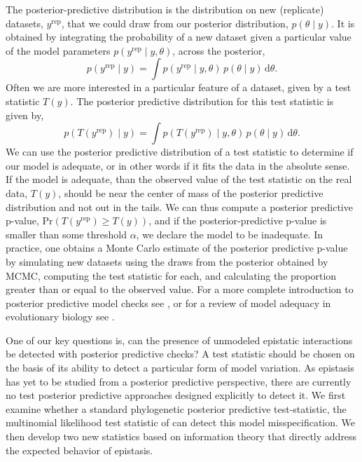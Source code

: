 \documentclass[11pt]{article}
\begin{document}
The posterior-predictive distribution is the distribution on new (replicate) datasets, $y^{\text{rep}}$, that we could draw from our posterior distribution, $p(\theta \mid y)$.
It is obtained by integrating the probability of a new dataset given a particular value of the model parameters $p(y^{\text{rep}} \mid y, \theta)$, across the posterior,
\[
  p(y^{\text{rep}} \mid y) =
  \int p(y^{\text{rep}} \mid y, \theta)\,
  p(\theta \mid y)\,
  \text{d}\theta.
\]
Often we are more interested in a particular feature of a dataset, given by a test statistic $T(y)$.
The posterior predictive distribution for this test statistic is given by,
\[
  p(T(y^{\text{rep}}) \mid y) =
  \int p(T(y^{\text{rep}}) \mid y, \theta)\,
  p(\theta \mid y)\,
  \text{d}\theta.
\]
We can use the posterior predictive distribution of a test statistic to determine if our model is adequate, or in other words if it fits the data in the absolute sense.
If the model is adequate, than the observed value of the test statistic on the real data, $T(y)$, should be near the center of mass of the posterior predictive distribution and not out in the tails.
We can thus compute a posterior predictive p-value, $\text{Pr}(T(y^{\text{rep}}) \geq T(y))$, and if the posterior-predictive p-value is smaller than some threshold $\alpha$, we declare the model to be inadequate.
In practice, one obtains a Monte Carlo estimate of the posterior predictive p-value by simulating new datasets using the draws from the posterior obtained by MCMC, computing the test statistic for each, and calculating the proportion greater than or equal to the observed value.
For a more complete introduction to posterior predictive model checks see \citet{gelman2004bda}, or for a review of model adequacy in evolutionary biology see \citet{brown2018evaluating}.

One of our key questions is, can the presence of unmodeled epistatic interactions be detected with posterior predictive checks?
A test statistic should be chosen on the basis of its ability to detect a particular form of model variation.
As epistasis has yet to be studied from a posterior predictive perspective, there are currently no test posterior predictive approaches designed explicitly to detect it.
We first examine whether a standard phylogenetic posterior predictive test-statistic, the multinomial likelihood test statistic of \cite{goldman1993statistical} can detect this model misspecification.
We then develop two new statistics based on information theory that directly address the expected behavior of epistasis.
\end{document}
